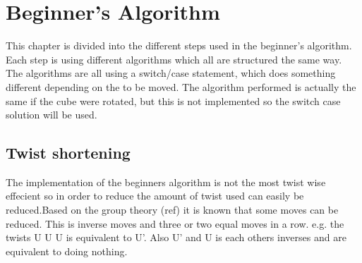 \chapter{Beginner's Algorithm}
This chapter is divided into the different steps used in the beginner's algorithm.
Each step is using different algorithms which all are structured the same way. The algorithms are all using a switch/case statement, which does something different depending on the \cpiece{} to be moved. The algorithm performed is actually the same if the cube were rotated, but this is not implemented so the switch case solution will be used.








\section{Twist shortening}
The implementation of the beginners algorithm is not the most twist wise effecient so in order to reduce the amount of twist used can easily be reduced.Based  on the group theory (ref) it is known that some moves can be reduced. This is inverse moves and  three or two equal moves  in a row. e.g.  the twists U U U is equivalent to U'. Also U' and U is each others inverses and are equivalent to doing nothing. 